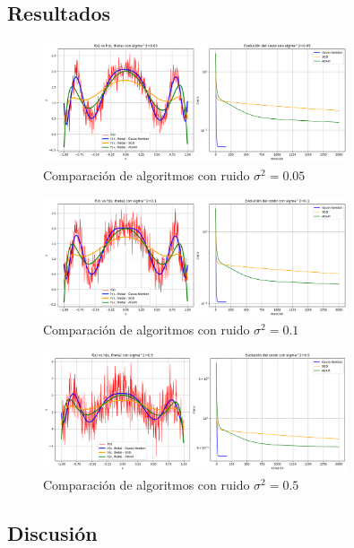 \documentclass{article}
\begin{document}
\subsection{Resultados}
\setcounter{equation}{0}

\begin{figure}[H]
    \centering
    \includegraphics[width=0.8\textwidth]{images/6_sigma_05.png}
    \caption{Comparación de algoritmos con ruido $\sigma^2 = 0.05$}
    \label{fig:noise_005}
\end{figure}

\begin{figure}[H]
    \centering
    \includegraphics[width=0.8\textwidth]{images/6_sigma_1.png}
    \caption{Comparación de algoritmos con ruido $\sigma^2 = 0.1$}
    \label{fig:noise_01}
\end{figure}

\begin{figure}[H]
    \centering
    \includegraphics[width=0.8\textwidth]{images/6_sigma_5.png}
    \caption{Comparación de algoritmos con ruido $\sigma^2 = 0.5$}
    \label{fig:noise_05}
\end{figure}

\subsection{Discusión}
\end{document}
